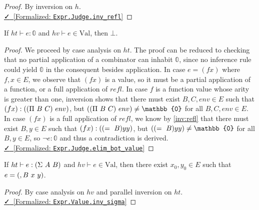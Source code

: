 \documentclass{lmcs}
\newcommand{\val}{\text{Val}}
\newcommand{\leanlink}[2]{
  \href{#1}{\textcolor{black}\faCheck~[Formalized: \texttt{#2}]}%
}
\begin{document}
\begin{proof}
  By inversion on \(h\).\\
  \noindent \leanlink{https://github.com/lexzaiello/DCC/blob/fb7acf6d9644df7d13c809d12609b59eaca5c763/Dcc/Metatheory/Progress.lean\#L409}{Expr.Judge.inv\_refl}
\end{proof}

\begin{lem}\label{inv:bot}
  If \(ht \vdash e : \mathbb{0}\) and \(hv \vdash e \in \val\), then \(\bot\).
\end{lem}

\begin{proof}
  We proceed by case analysis on \(ht\). The proof can be reduced to checking that no partial application of a combinator can inhabit \(\mathbb{0}\), since no inference rule could yield \(\mathbb{0}\) in the consequent besides application. In case \(e = (f x)\) where \(f, x \in E\), we observe that \((f x)\) is a value, so it must be a partial application of a function, or a full application of \(refl\). In case \(f\) is a function value whose arity is greater than one, inversion shows that there must exist \(B, C, env \in E\) such that \((f x) : (\comb[\Pi][B][C]\ env)\), but \((\comb[\Pi][B][C]\ env) \neq \mathbb{0}\) for all \(B, C, env \in E\). In case \((f x)\) is a full application of \(refl\), we know by \ref{inv:refl} that there must exist \(B, y \in E\) such that \((f x) : (\comb[=][B] y y)\), but \((\comb[=][B] y y) \neq \mathbb{0}\) for all \(B, y \in E\), so \(\neg e : \mathbb{0}\) and thus a contradiction is derived.\\
  \noindent \leanlink{https://github.com/lexzaiello/DCC/blob/fb7acf6d9644df7d13c809d12609b59eaca5c763/Dcc/Metatheory/Progress.lean\#L444}{Expr.Judge.elim\_bot\_value}
\end{proof}

\begin{lem}\label{inv:sigma}
  If \(ht \vdash e : \comb[\Sigma][A][B]\) and \(hv \vdash e \in \val\), then there exist \(x_0, y_0 \in E\) such that \(e = \comb[,B][x][y]\).
\end{lem}

\begin{proof}
  By case analysis on \(hv\) and parallel inversion on \(ht\).\\
  \noindent \leanlink{https://github.com/lexzaiello/DCC/blob/fb7acf6d9644df7d13c809d12609b59eaca5c763/Dcc/Metatheory/Progress.lean\#L565}{Expr.Value.inv\_sigma}
\end{proof}
\end{document}
